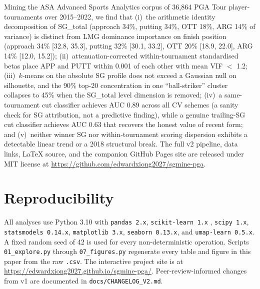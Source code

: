 \documentclass[11pt]{article}
\begin{document}
Mining the ASA Advanced Sports Analytics corpus of 36{,}864 PGA Tour player-tournaments over 2015--2022, we find that (i)~the arithmetic identity decomposition of SG\_total (approach 34\%, putting 34\%, OTT 18\%, ARG 14\% of variance) is distinct from LMG dominance importance on finish position (approach 34\% [32.8, 35.3], putting 32\% [30.1, 33.2], OTT 20\% [18.9, 22.0], ARG 14\% [12.0, 15.2]); (ii)~attenuation-corrected within-tournament standardised betas place APP and PUTT within 0.001 of each other with mean VIF $<$ 1.2; (iii)~$k$-means on the absolute SG profile does not exceed a Gaussian null on silhouette, and the 90\% top-20 concentration in one ``ball-striker'' cluster collapses to 45\% when the SG\_total level dimension is removed; (iv)~a same-tournament cut classifier achieves AUC 0.89 across all CV schemes (a sanity check for SG attribution, not a predictive finding), while a genuine trailing-SG cut classifier achieves AUC 0.63 that recovers the honest value of recent form; and (v)~neither winner SG nor within-tournament scoring dispersion exhibits a detectable linear trend or a 2018 structural break.  The full v2 pipeline, data links, LaTeX source, and the companion GitHub Pages site are released under MIT license at \url{https://github.com/edwardxiong2027/sgmine-pga}.

\section*{Reproducibility}

All analyses use Python 3.10 with \texttt{pandas 2.x}, \texttt{scikit-learn 1.x} \citep{pedregosa2011scikit}, \texttt{scipy 1.x}, \texttt{statsmodels 0.14.x}, \texttt{matplotlib 3.x}, \texttt{seaborn 0.13.x}, and \texttt{umap-learn 0.5.x}.  A fixed random seed of 42 is used for every non-deterministic operation.  Scripts \texttt{01\_explore.py} through \texttt{07\_figures.py} regenerate every table and figure in this paper from the raw \texttt{.csv}.  The interactive project site is at \url{https://edwardxiong2027.github.io/sgmine-pga/}.  Peer-review-informed changes from v1 are documented in \texttt{docs/CHANGELOG\_V2.md}.



\end{document}
